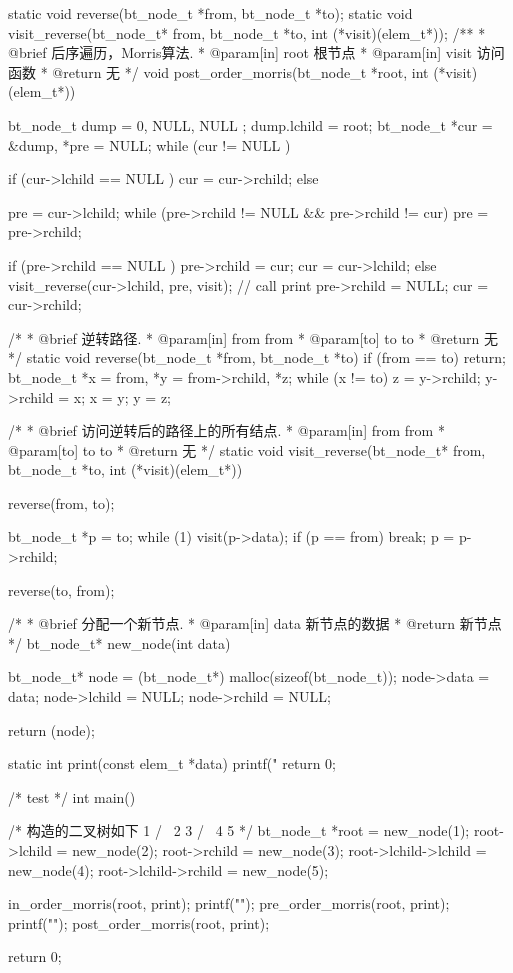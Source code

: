 \begin{Codex}[label=morris_traversal.cpp]
static void reverse(bt_node_t *from, bt_node_t *to);
static void visit_reverse(bt_node_t* from, bt_node_t *to, int (*visit)(elem_t*));
/**
 * @brief 后序遍历，Morris算法.
 * @param[in] root 根节点
 * @param[in] visit 访问函数
 * @return 无
 */
void post_order_morris(bt_node_t *root, int (*visit)(elem_t*)) {
    bt_node_t dump = { 0, NULL, NULL };
    dump.lchild = root;
    bt_node_t *cur = &dump, *pre = NULL;
    while (cur != NULL ) {
        if (cur->lchild == NULL ) {
            cur = cur->rchild;
        } else {
            pre = cur->lchild;
            while (pre->rchild != NULL && pre->rchild != cur)
                pre = pre->rchild;

            if (pre->rchild == NULL ) {
                pre->rchild = cur;
                cur = cur->lchild;
            } else {
                visit_reverse(cur->lchild, pre, visit);  // call print
                pre->rchild = NULL;
                cur = cur->rchild;
            }
        }
    }
}

/*
 * @brief 逆转路径.
 * @param[in] from from
 * @param[to] to to
 * @return 无
 */
static void reverse(bt_node_t *from, bt_node_t *to) {
    if (from == to) return;
    bt_node_t *x = from, *y = from->rchild, *z;
    while (x != to) {
        z = y->rchild;
        y->rchild = x;
        x = y;
        y = z;
    }
}

/*
 * @brief  访问逆转后的路径上的所有结点.
 * @param[in] from from
 * @param[to] to to
 * @return 无
 */
static void visit_reverse(bt_node_t* from, bt_node_t *to, int (*visit)(elem_t*)) {
    reverse(from, to);

    bt_node_t *p = to;
    while (1) {
        visit(p->data);
        if (p == from)
            break;
        p = p->rchild;
    }

    reverse(to, from);
}

/*
 * @brief 分配一个新节点.
 * @param[in] data 新节点的数据
 * @return 新节点
 */
bt_node_t* new_node(int data) {
    bt_node_t* node = (bt_node_t*) malloc(sizeof(bt_node_t));
    node->data = data;
    node->lchild = NULL;
    node->rchild = NULL;

    return (node);
}

static int print(const elem_t *data) {
    printf(" %
    return 0;
}

/* test */
int main() {
    /* 构造的二叉树如下
       1
     /   \
    2      3
  /  \
4     5
     */
    bt_node_t *root = new_node(1);
    root->lchild = new_node(2);
    root->rchild = new_node(3);
    root->lchild->lchild = new_node(4);
    root->lchild->rchild = new_node(5);

    in_order_morris(root, print);
    printf("\n");
    pre_order_morris(root, print);
    printf("\n");
    post_order_morris(root, print);

    return 0;
}
\end{Codex}


